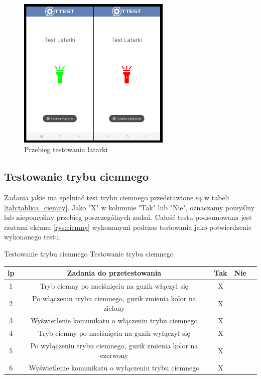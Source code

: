 \begin{figure}[!hbt]
	\begin{center}
		\includegraphics[angle=360, width=0.65\textwidth]{rys/punkt5/latarka.jpg}
		\caption{Przebieg testowania latarki}
		\label{rys:latarka}
	\end{center}
\end{figure}   

\newpage


\subsection{Testowanie trybu ciemnego}

\hspace{0.60cm}Zadania jakie ma spełniać test trybu ciemnego przedstawione są w tabeli \ref{tab:tablica_ciemny}. Jako "X" w kolumnie "Tak" lub "Nie", oznaczamy pomyślny lub niepomyślny przebieg poszczególnych zadań. Całość testu podsumowana jest rzutami ekranu \ref{rys:ciemny} wykonanymi podczas testowania jako potwierdzenie wykonanego testu.

\begin{tabela}
	{Testowanie trybu ciemnego}	%
	{Testowanie trybu ciemnego}	%
	{
		\begin{tabular}{|c|c|c|c|c|} \hline
			\textbf{lp} & \textbf{Zadania do przetestowania} & \textbf{Tak} & \textbf{Nie} \\ \hline
			1 & Tryb ciemny po naciśnięciu na guzik włączył się & X & ~ \\ \hline
			2 & Po włączeniu trybu ciemnego, guzik zmienia kolor na zielony & X & ~ \\ \hline
			3 & Wyświetlenie komunikatu o włączeniu trybu ciemnego & X & ~ \\ \hline
			4 & Tryb ciemny po naciśnięciu na guzik wyłączył się & X & ~ \\ \hline
			5 & Po wyłączeniu trybu ciemnego, guzik zmienia kolor na czerwony & X & ~ \\ \hline
			6 & Wyświetlenie komunikatu o wyłączeniu trybu ciemnego & X & ~ \\ \hline
	\end{tabular}	}
	\label{tab:tablica_ciemny}
\end{tabela}

